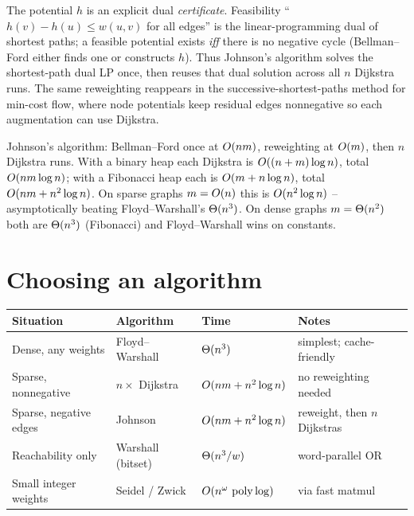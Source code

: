 \begin{whybox}
The potential $h$ is an explicit dual \emph{certificate}. Feasibility ``$h(v)-h(u)\le w(u,v)$ for all edges''
is the linear-programming dual of shortest paths; a feasible potential exists \emph{iff} there is no
negative cycle (Bellman--Ford either finds one or constructs $h$). Thus Johnson's algorithm
solves the shortest-path dual LP once, then reuses that dual solution across all $n$ Dijkstra runs. The same reweighting
reappears in the successive-shortest-paths method for min-cost flow, where node potentials keep residual
edges nonnegative so each augmentation can use Dijkstra.
\end{whybox}

\begin{complexitybox}
Johnson's algorithm: Bellman--Ford once at $O(nm)$, reweighting at $O(m)$, then $n$ Dijkstra runs.
With a binary heap each Dijkstra is $O((n+m)\log n)$, total $O(nm\log n)$; with a Fibonacci heap each
is $O(m+n\log n)$, total $O(nm+n^2\log n)$. On sparse graphs $m=O(n)$ this is $O(n^2\log n)$ --
asymptotically beating Floyd--Warshall's $\Theta(n^3)$. On dense graphs $m=\Theta(n^2)$ both are $\Theta(n^3)$
(Fibonacci) and Floyd--Warshall wins on constants.
\end{complexitybox}

\section{Choosing an algorithm}
\label{ch09:choosing}

\begin{center}
\begin{tabular}{@{}llll@{}}
\toprule
Situation & Algorithm & Time & Notes\\
\midrule
Dense, any weights & Floyd--Warshall & $\Theta(n^3)$ & simplest; cache-friendly\\
Sparse, nonnegative & $n\times$ Dijkstra & $O(nm+n^2\log n)$ & no reweighting needed\\
Sparse, negative edges & Johnson & $O(nm+n^2\log n)$ & reweight, then $n$ Dijkstras\\
Reachability only & Warshall (bitset) & $\Theta(n^3/w)$ & word-parallel OR\\
Small integer weights & Seidel / Zwick & $O(n^\omega\,\operatorname{poly}\log)$ & via fast matmul\\
\bottomrule
\end{tabular}
\end{center}

